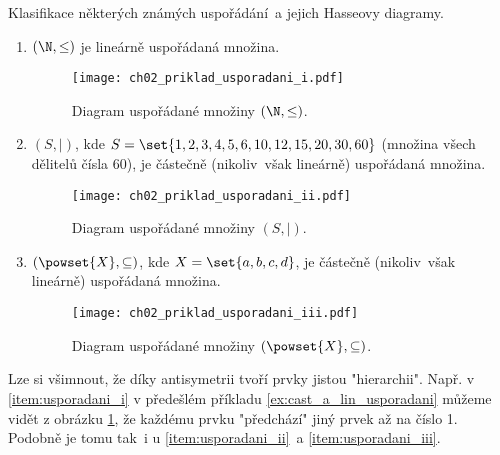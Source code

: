 \begin{example}\label{ex:cast_a_lin_usporadani}
    Klasifikace některých známých uspořádání~a jejich Hasseovy diagramy.
    \begin{enumerate}[label=(\roman*)]
        \item\label{item:usporadani_i} $(\N,\leq)$ je lineárně uspořádaná množina.
        \begin{figure}[H]
            \centering
            \texttt{[image: ch02\_priklad\_usporadani\_i.pdf]}
            \caption{Diagram uspořádané množiny $(\N,\leq)$.}
            \label{fig:priklad_usporadani_i}
        \end{figure}
        \item\label{item:usporadani_ii} $(S,\mid)$, kde $S=\set{1, 2, 3, 4, 5, 6, 10, 12, 15, 20, 30, 60}$ (množina všech dělitelů čísla 60), je částečně (nikoliv~však lineárně) uspořádaná množina.
        \begin{figure}[H]
            \centering
            \texttt{[image: ch02\_priklad\_usporadani\_ii.pdf]}
            \caption{Diagram uspořádané množiny $(S,\mid)$.}
            \label{fig:priklad_usporadani_ii}
        \end{figure}
        \item\label{item:usporadani_iii} $(\powset{X}, \subseteq)$, kde $X=\set{a,b,c,d}$, je částečně (nikoliv~však lineárně) uspořádaná množina.
        \begin{figure}[H]
            \centering
            \texttt{[image: ch02\_priklad\_usporadani\_iii.pdf]}
            \caption{Diagram uspořádané množiny $(\powset{X}, \subseteq)$.}
            \label{fig:priklad_usporadani_iii}
        \end{figure}
    \end{enumerate}
\end{example}
Lze si všimnout, že díky antisymetrii tvoří prvky jistou "hierarchii". Např. v \ref{item:usporadani_i} v předešlém příkladu \ref{ex:cast_a_lin_usporadani} můžeme vidět z obrázku \ref{fig:priklad_usporadani_i}, že každému prvku "předchází" jiný prvek až na číslo 1. Podobně je tomu tak~i u \ref{item:usporadani_ii}~a \ref{item:usporadani_iii}. %
